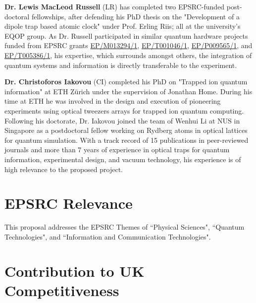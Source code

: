 \documentclass{epsrc}
\begin{document}
\vspace{16pt}

\textbf{Dr. Lewis MacLeod Russell} (LR) has completed two EPSRC-funded post-doctoral fellowships, after defending his PhD thesis on the "Development of a dipole trap based atomic clock" under Prof. Erling Riis; all at the university's EQOP group. As Dr. Russell participated in similar quantum hardware projects funded from EPSRC grants \href{https://gow.epsrc.ukri.org/NGBOViewGrant.aspx?GrantRef=EP/M013294/1}{EP/M013294/1}, \href{https://gow.epsrc.ukri.org/NGBOViewGrant.aspx?GrantRef=EP/T001046/1}{EP/T001046/1}, \href{https://gow.epsrc.ukri.org/NGBOViewGrant.aspx?GrantRef=EP/P009565/1}{EP/P009565/1}, and \href{https://gow.epsrc.ukri.org/NGBOViewGrant.aspx?GrantRef=EP/T005386/1}{EP/T005386/1}, his expertise, which surrounds amongst others, the integration of quantum systems and information is directly transferable to the experiment.

\vspace{16pt}

\textbf{Dr. Christoforos Iakovou} (CI) completed his PhD on "Trapped ion quantum information" at ETH Zürich under the supervision of Jonathan Home. During his time at ETH he was involved in the design and execution of pioneering experiments using optical tweezers arrays for trapped ion quantum computing. Following his doctorate, Dr. Iakovou joined the team of Wenhui Li at NUS in Singapore as a postdoctoral fellow working on Rydberg atoms in optical lattices for quantum simulation. With a track record of 15 publications in peer-reviewed journals and more than 7 years of experience in optical traps for quantum information, experimental design, and vacuum technology, his experience is of high relevance to the proposed project.

\vspace{16pt}

\section{EPSRC Relevance}

This proposal addresses the EPSRC Themes of ``Physical Sciences", ``Quantum Technologies", and ``Information and Communication Technologies".

\vspace{16pt}

\section{Contribution to UK Competitiveness}
\end{document}
